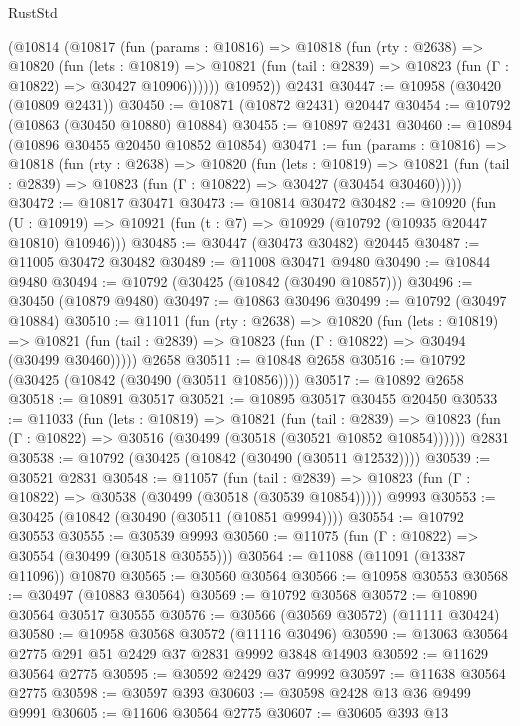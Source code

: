 \begin{lexlean}{RustStd}
\begin{coremodule}
      (@10814
        (@10817
          (fun (params : @10816) =>
          @10818
            (fun (rty : @2638) =>
            @10820
              (fun (lets : @10819) =>
              @10821 (fun (tail : @2839) => @10823 (fun (Γ : @10822) => @30427 @10906))))))
        @10952))
    @2431
@30447 := @10958 (@30420 (@10809 @2431))
@30450 := @10871 (@10872 @2431) @20447
@30454 := @10792 (@10863 (@30450 @10880) @10884)
@30455 := @10897 @2431
@30460 := @10894 (@10896 @30455 @20450 @10852 @10854)
@30471 := fun (params : @10816) =>
  @10818
    (fun (rty : @2638) =>
    @10820
      (fun (lets : @10819) =>
      @10821 (fun (tail : @2839) => @10823 (fun (Γ : @10822) => @30427 (@30454 @30460)))))
@30472 := @10817 @30471
@30473 := @10814 @30472
@30482 := @10920
    (fun (U : @10919) => @10921 (fun (t : @7) => @10929 (@10792 (@10935 @20447 @10810) @10946)))
@30485 := @30447 (@30473 @30482) @20445
@30487 := @11005 @30472 @30482
@30489 := @11008 @30471 @9480
@30490 := @10844 @9480
@30494 := @10792 (@30425 (@10842 (@30490 @10857)))
@30496 := @30450 (@10879 @9480)
@30497 := @10863 @30496
@30499 := @10792 (@30497 @10884)
@30510 := @11011
    (fun (rty : @2638) =>
    @10820
      (fun (lets : @10819) =>
      @10821 (fun (tail : @2839) => @10823 (fun (Γ : @10822) => @30494 (@30499 @30460)))))
    @2658
@30511 := @10848 @2658
@30516 := @10792 (@30425 (@10842 (@30490 (@30511 @10856))))
@30517 := @10892 @2658
@30518 := @10891 @30517
@30521 := @10895 @30517 @30455 @20450
@30533 := @11033
    (fun (lets : @10819) =>
    @10821
      (fun (tail : @2839) =>
      @10823 (fun (Γ : @10822) => @30516 (@30499 (@30518 (@30521 @10852 @10854))))))
    @2831
@30538 := @10792 (@30425 (@10842 (@30490 (@30511 @12532))))
@30539 := @30521 @2831
@30548 := @11057
    (fun (tail : @2839) => @10823 (fun (Γ : @10822) => @30538 (@30499 (@30518 (@30539 @10854)))))
    @9993
@30553 := @30425 (@10842 (@30490 (@30511 (@10851 @9994))))
@30554 := @10792 @30553
@30555 := @30539 @9993
@30560 := @11075 (fun (Γ : @10822) => @30554 (@30499 (@30518 @30555)))
@30564 := @11088 (@11091 (@13387 @11096)) @10870
@30565 := @30560 @30564
@30566 := @10958 @30553
@30568 := @30497 (@10883 @30564)
@30569 := @10792 @30568
@30572 := @10890 @30564 @30517 @30555
@30576 := @30566 (@30569 @30572) (@11111 @30424)
@30580 := @10958 @30568 @30572 (@11116 @30496)
@30590 := @13063 @30564 @2775 @291 @51 @2429 @37 @2831 @9992 @3848 @14903
@30592 := @11629 @30564 @2775
@30595 := @30592 @2429 @37 @9992
@30597 := @11638 @30564 @2775
@30598 := @30597 @393
@30603 := @30598 @2428 @13 @36 @9499 @9991
@30605 := @11606 @30564 @2775
@30607 := @30605 @393 @13

\end{coremodule}
\end{lexlean}
